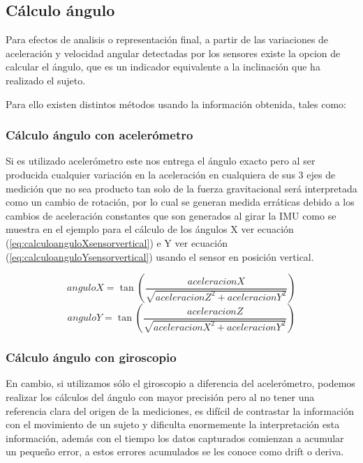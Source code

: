 \documentclass[12pt,a4paper]{article}
\begin{document}
			\subsection{Cálculo ángulo} Para efectos de analisis o representación final, a partir de las variaciones de aceleración y velocidad angular detectadas por los sensores existe la opcion de calcular el ángulo, que es un indicador equivalente a la inclinación que ha realizado el sujeto.
			
			Para ello existen distintos métodos usando la información obtenida, tales como:
			
			
			\subsubsection{Cálculo ángulo con acelerómetro} Si es utilizado acelerómetro este nos entrega el ángulo exacto pero al ser producida cualquier variación en la aceleración en cualquiera de sus 3 ejes de medición que no sea producto tan solo de la fuerza gravitacional será interpretada como un cambio de rotación, por lo cual se generan medida erráticas debido a los cambios de aceleración constantes que son generados al girar la IMU como se muestra en el ejemplo para el cálculo de los ángulos X ver ecuación (\ref{eq:calculoanguloXsensorvertical}) e Y ver ecuación (\ref{eq:calculoanguloYsensorvertical}) usando el sensor en posición vertical.
			
			\begin{figure}[H]
				\begin{equation}
					anguloX = \tan{\left(\frac{aceleracionX}{\sqrt{aceleracionZ^{2}+aceleracionY^{2}}}\right)}
					\label{eq:calculoanguloXsensorvertical}
				\end{equation}
				\begin{equation}
					anguloY = \tan{\left(\frac{aceleracionZ}{\sqrt{aceleracionX^{2}+aceleracionY^{2}}}\right)}
					\label{eq:calculoanguloYsensorvertical}
				\end{equation}
			\end{figure}
			
			\subsubsection{Cálculo ángulo con giroscopio} 
			En cambio, si utilizamos sólo el giroscopio a diferencia del acelerómetro, podemos realizar los cálculos del ángulo con mayor precisión pero al no tener una referencia clara del origen de la mediciones, es difícil de contrastar la información con el movimiento de un sujeto y dificulta enormemente la  interpretación esta información, además con el tiempo los datos capturados comienzan a acumular un pequeño error, a estos errores acumulados se les conoce como drift o deriva.
			
\end{document}
